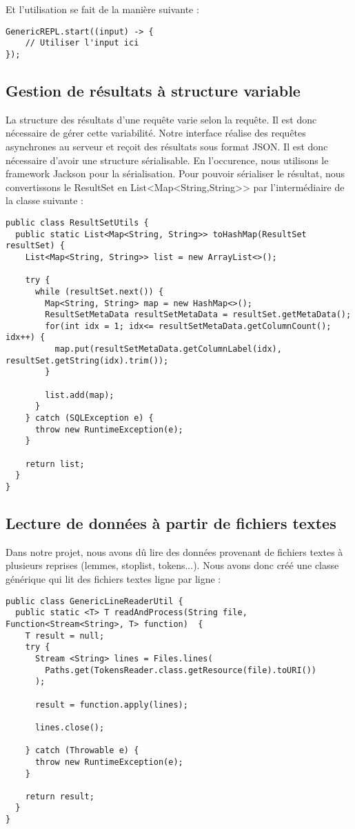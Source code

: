 \documentclass[a4paper]{elsarticle}
\begin{document}
Et l'utilisation se fait de la manière suivante :

\begin{lstlisting}
GenericREPL.start((input) -> {
	// Utiliser l'input ici
});
\end{lstlisting}

\subsection{Gestion de résultats à structure variable}

La structure des résultats d'une requête varie selon la requête. Il est donc nécessaire de gérer cette variabilité. Notre interface réalise des requêtes asynchrones au serveur et reçoit des résultats sous format JSON. Il est donc nécessaire d'avoir une structure sérialisable. En l'occurence, nous utilisons le framework Jackson pour la sérialisation. Pour pouvoir sérialiser le résultat, nous convertissons le ResultSet en List<Map<String,String>> par l'intermédiaire de la classe suivante :

\begin{lstlisting}
public class ResultSetUtils {
  public static List<Map<String, String>> toHashMap(ResultSet resultSet) {
    List<Map<String, String>> list = new ArrayList<>();

    try {
      while (resultSet.next()) {
        Map<String, String> map = new HashMap<>();
        ResultSetMetaData resultSetMetaData = resultSet.getMetaData();
        for(int idx = 1; idx<= resultSetMetaData.getColumnCount(); idx++) {
          map.put(resultSetMetaData.getColumnLabel(idx), resultSet.getString(idx).trim());
        }

        list.add(map);
      }
    } catch (SQLException e) {
      throw new RuntimeException(e);
    }

    return list;
  }
}
\end{lstlisting}

\subsection{Lecture de données à partir de fichiers textes}

Dans notre projet, nous avons dû lire des données provenant de fichiers textes à plusieurs reprises (lemmes, stoplist, tokens...). Nous avons donc créé une classe générique qui lit des fichiers textes ligne par ligne :

\begin{lstlisting}
public class GenericLineReaderUtil {
  public static <T> T readAndProcess(String file, Function<Stream<String>, T> function)  {
    T result = null;
    try {
      Stream <String> lines = Files.lines(
        Paths.get(TokensReader.class.getResource(file).toURI())
      );

      result = function.apply(lines);

      lines.close();

    } catch (Throwable e) {
      throw new RuntimeException(e);
    }	

    return result;
  }
}
\end{lstlisting}
\end{document}
